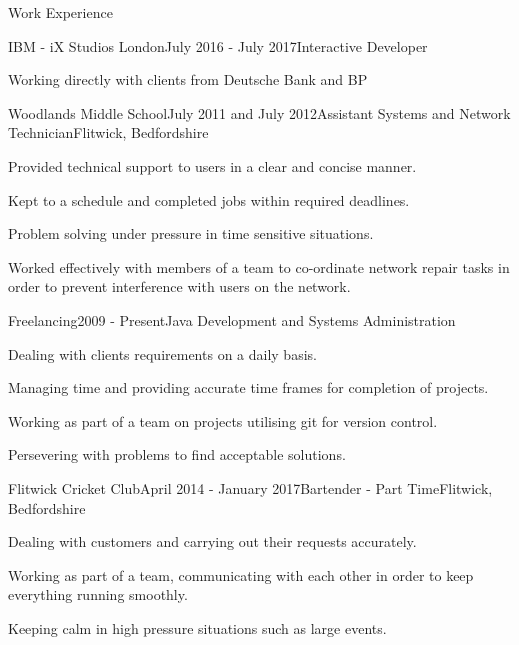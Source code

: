 \documentclass{resume} %
\begin{document}
\begin{rSection}{Work Experience}
	
\begin{rSubsection}{IBM - iX Studios London}{July 2016 - July 2017}{Interactive Developer}
	\item Working directly with clients from Deutsche Bank and BP
\end{rSubsection}


\begin{rSubsection}{Woodlands Middle School}{July 2011 and July 2012}{Assistant Systems and Network Technician}{Flitwick, Bedfordshire}
	\item Provided technical support to users in a clear and concise manner.
	\item Kept to a schedule and completed jobs within required deadlines.
	\item Problem solving under pressure in time sensitive situations.
	\item Worked effectively with members of a team to co-ordinate network repair tasks in order to prevent interference with users on the network.
\end{rSubsection}


\begin{rSubsection}{Freelancing}{2009 - Present}{Java Development and Systems Administration}{}
\item Dealing with clients requirements on a daily basis.
\item Managing time and providing accurate time frames for completion of projects.
\item Working as part of a team on projects utilising git for version control.
\item Persevering with problems to find acceptable solutions.
\end{rSubsection}


\begin{rSubsection}{Flitwick Cricket Club}{April 2014 - January 2017}{Bartender - Part Time}{Flitwick, Bedfordshire}
\item Dealing with customers and carrying out their requests accurately.
\item Working as part of a team, communicating with each other in order to keep everything running smoothly.
\item Keeping calm in high pressure situations such as large events.
\end{rSubsection}

\end{rSection}
\end{document}
